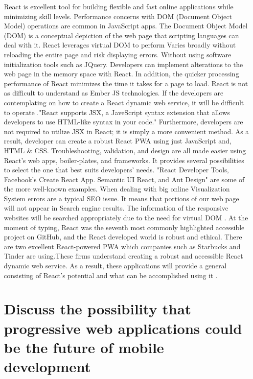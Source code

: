 \documentclass{article}
\begin{document}
React is excellent tool for building flexible and fast online applications while minimizing skill levels. Performance concerns with DOM (Document Object Model) operations are common in JavaScript apps. The Document Object Model (DOM) is a conceptual depiction of the web page that scripting languages can deal with it. React leverages virtual DOM to perform Varies broadly without reloading the entire page and risk displaying errors. Without using software initialization tools such as JQuery. Developers can implement alterations to the web page in the memory space with React. In addition, the quicker processing performance of React minimizes the time it takes for a page to load. React is not as difficult to understand as Ember JS technologies. If the developers are contemplating on how to create a React dynamic web service, it will be difficult to operate \cite{544352}."React supports JSX, a JaveScript syntax extension that allows developers to use HTML-like syntax in your code." Furthermore, developers are not required to utilize JSX in React; it is simply a more convenient method. As a result, developer can create a robust React PWA using just JavaScript and, HTML & CSS. Troubleshooting, validation, and design are all made easier using React's web apps, boiler-plates, and frameworks. It provides several possibilities to select the one that best suits developers' needs. "React Developer Tools, Facebook's Create React App. Semantic UI React, and Ant Design" are some of the more well-known examples. When dealing with big online Visualization System errors are a typical SEO issue. It means that portions of our web page will not appear in Search engine results. The information of the responsive websites will be searched appropriately due to the need for virtual DOM \cite{rabArticle}. At the moment of typing, React was the seventh most commonly highlighted accessible project on GitHub, and the React developed world is robust and ethical. There are two excellent React-powered PWA which companies such as Starbucks and Tinder are using.These firms understand creating a robust and accessible React dynamic web service. As a result, these applications will provide a general consisting of React's potential and what can be accomplished using it \cite{rbArticle}.

 
\section*{Discuss the possibility that progressive web applications could be the future of mobile development}
\end{document}
